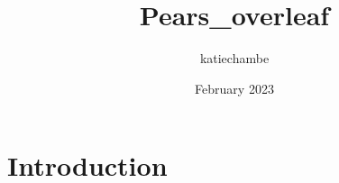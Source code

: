 \documentclass{article}
\title{Pears_overleaf}
\author{katiechambe }
\date{February 2023}
\begin{document}
\maketitle

\section{Introduction}
\end{document}
